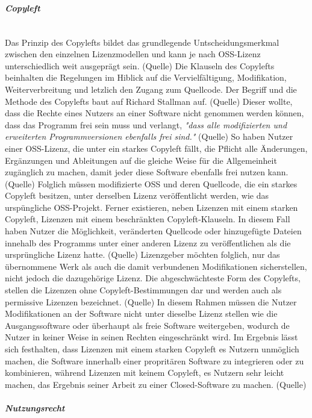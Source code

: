 \subparagraph{Copyleft} $~$

Das Prinzip des Copylefts bildet das grundlegende Untscheidungsmerkmal zwischen den einzelnen Lizenzmodellen und kann je nach OSS-Lizenz unterschiedlich weit ausgeprägt sein. (Quelle) Die Klauseln des Copylefts beinhalten die Regelungen im Hiblick auf die Vervielfältigung, Modifikation, Weiterverbreitung und letzlich den Zugang zum Quellcode. Der Begriff und die Methode des Copylefts baut auf Richard Stallman auf. (Quelle) Dieser wollte, dass die Rechte eines Nutzers an einer Software nicht genommen werden können, dass das Programm frei sein muss und verlangt, \textit{"dass alle modifizierten und erweiterten Programmversionen ebenfalls frei sind."} (Quelle) So haben Nutzer einer OSS-Lizenz, die unter ein starkes Copyleft fällt, die Pflicht alle Änderungen, Ergänzungen und Ableitungen auf die gleiche Weise für die Allgemeinheit zugänglich zu machen, damit jeder diese Software ebenfalls frei nutzen kann. (Quelle) Folglich müssen modifizierte OSS und deren Quellcode, die ein starkes Copyleft besitzen, unter derselben Lizenz veröffentlicht werden, wie das urspüngliche OSS-Projekt. Ferner existieren, neben Lizenzen mit einem starken Copyleft, Lizenzen mit einem beschränkten Copyleft-Klauseln. In diesem Fall haben Nutzer die Möglichkeit, veränderten Quellcode oder hinzugefügte Dateien innehalb des Programms unter einer anderen Lizenz zu veröffentlichen als die ursprüngliche Lizenz hatte. (Quelle) Lizenzgeber möchten folglich, nur das übernommene Werk als auch die damit verbundenen Modifikationen sicherstellen, nicht jedoch die dazugehörige Lizenz. Die abgeschwächteste Form des Copylefts, stellen die Lizenzen ohne Copyleft-Bestimmungen dar und werden auch als permissive Lizenzen bezeichnet. (Quelle) In diesem Rahmen müssen die Nutzer Modifikationen an der Software nicht unter dieselbe Lizenz stellen wie die Ausgangssoftware oder überhaupt als freie Software weitergeben, wodurch de Nutzer in keiner Weise in seinen Rechten eingeschränkt wird. Im Ergebnis lässt sich festhalten, dass Lizenzen mit einem starken Copyleft es Nutzern unmöglich machen, die Software innerhalb einer propritären Software zu integrieren oder zu kombinieren, während Lizenzen mit keinem Copyleft, es Nutzern sehr leicht machen, das Ergebnis seiner Arbeit zu einer Closed-Software zu machen. (Quelle) 

\subparagraph{Nutzungsrecht} $~$

